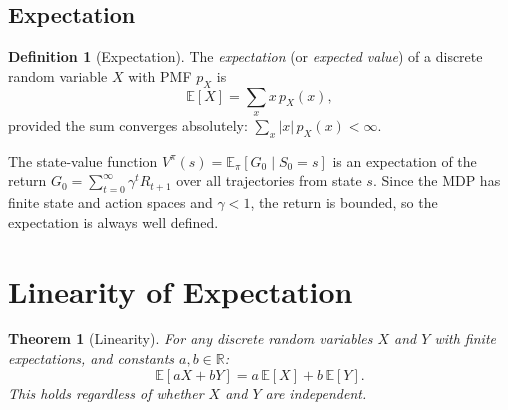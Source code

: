 \documentclass[11pt,a4paper]{article}
\theoremstyle{definition}
\newtheorem{definition}{Definition}[section]
\theoremstyle{plain}
\newtheorem{theorem}{Theorem}[section]
\theoremstyle{remark}
\newcommand{\E}{\mathbb{E}}
\newcommand{\R}{\mathbb{R}}
\begin{document}
\subsection{Expectation}
\label{subsec:expectation}

\begin{definition}[Expectation]
\label{def:expectation}
The \emph{expectation} (or \emph{expected value}) of a discrete random variable $X$ with PMF $p_X$ is
\begin{equation}
    \E[X] = \sum_{x} x\, p_X(x),
    \label{eq:expectation_def}
\end{equation}
provided the sum converges absolutely: $\sum_x |x|\, p_X(x) < \infty$.
\end{definition}

\begin{tdconnection}
The state-value function $V^\pi(s) = \E_\pi[G_0 \mid S_0 = s]$ is an expectation of the return $G_0 = \sum_{t=0}^\infty \gamma^t R_{t+1}$ over all trajectories from state $s$. Since the MDP has finite state and action spaces and $\gamma < 1$, the return is bounded, so the expectation is always well defined.
\end{tdconnection}

\section{Linearity of Expectation}
\label{sec:linearity}

\begin{keyresult}
\begin{theorem}[Linearity]
\label{thm:linearity}
For any discrete random variables $X$ and $Y$ with finite expectations, and constants $a, b \in \R$:
\begin{equation}
    \E[aX + bY] = a\,\E[X] + b\,\E[Y].
    \label{eq:linearity}
\end{equation}
This holds regardless of whether $X$ and $Y$ are independent.
\end{theorem}
\end{keyresult}
\end{document}
